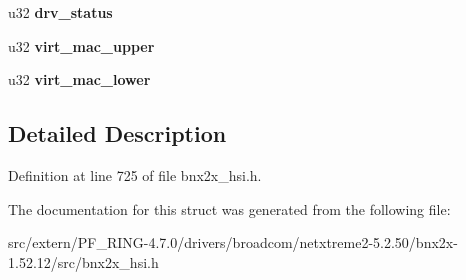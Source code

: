 \begin{DoxyCompactItemize}
\item 
\hypertarget{structdrv__func__mb_a5503ddbbf65a00003f8eeb9441dff5f5}{
u32 {\bfseries drv\_\-status}}
\label{structdrv__func__mb_a5503ddbbf65a00003f8eeb9441dff5f5}

\item 
\hypertarget{structdrv__func__mb_a6c8c49f780096a75d0ed9204ddf594b8}{
u32 {\bfseries virt\_\-mac\_\-upper}}
\label{structdrv__func__mb_a6c8c49f780096a75d0ed9204ddf594b8}

\item 
\hypertarget{structdrv__func__mb_afb39ee7c11d35379ab3476647807ba1a}{
u32 {\bfseries virt\_\-mac\_\-lower}}
\label{structdrv__func__mb_afb39ee7c11d35379ab3476647807ba1a}

\end{DoxyCompactItemize}


\subsection{Detailed Description}


Definition at line 725 of file bnx2x\_\-hsi.h.



The documentation for this struct was generated from the following file:\begin{DoxyCompactItemize}
\item 
src/extern/PF\_\-RING-\/4.7.0/drivers/broadcom/netxtreme2-\/5.2.50/bnx2x-\/1.52.12/src/bnx2x\_\-hsi.h\end{DoxyCompactItemize}

